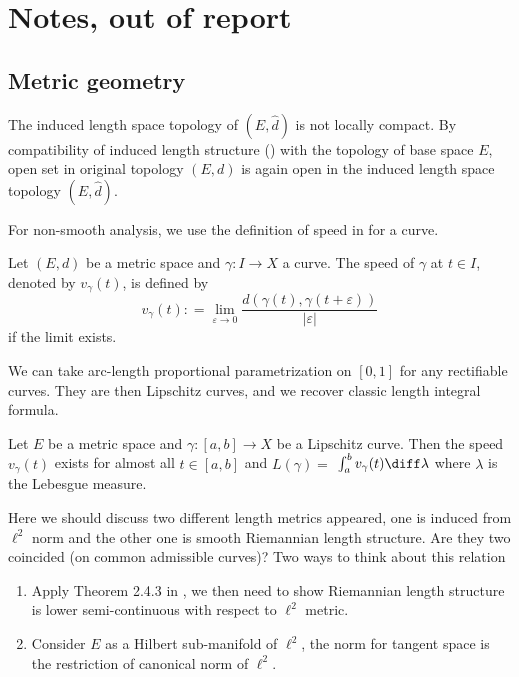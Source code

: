 \chapter{Notes, out of report}
\section{Metric geometry}

The induced length space topology of $(E, \hat{d})$ is not locally compact.
By compatibility of induced length structure (\cite[Exercise 2.1.5]{burago2001course}) with the topology of base space $E$,
open set in original topology $(E, d)$ is again open in the induced length space topology $(E, \hat{d})$.

For non-smooth analysis, we use the definition of speed in \cite[Section 2.7]{burago2001course} for a curve.

\begin{defn}
	Let \( ( E , d ) \) be a metric space and \( \gamma : I \rightarrow X \) a curve.
	The speed of \( \gamma \) at \( t \in I \), denoted by \( v _ { \gamma } ( t ) \),
	is defined by
	\[ v _ { \gamma } ( t ) : = \lim _ { \varepsilon \rightarrow 0 } \frac { d ( \gamma ( t ) , \gamma ( t + \varepsilon ) ) } { | \varepsilon | } \]
	if the limit exists.
\end{defn}

We can take arc-length proportional parametrization on $[0,1]$ for any rectifiable curves.
They are then Lipschitz curves, and we recover classic length integral formula.

\begin{thm}
	Let \( E \) be a metric space and \( \gamma : [ a , b ] \rightarrow X \) be a Lipschitz curve.
	Then the speed \( v _ { \gamma } ( t ) \) exists for almost all \( t \in [ a , b ] \) and \( L ( \gamma ) = \)
	\( \int _ { a } ^ { b } v _ { \gamma } ( t ) \diff \lambda \) where $\lambda$ is the Lebesgue measure.
\end{thm}

\begin{rmk}
	Here we should discuss two different length metrics appeared, one is induced from $\ell^2$ norm and the other one is smooth Riemannian length structure. Are they two coincided (on common admissible curves)? Two ways to think about this relation
	\begin{enumerate}
		\item Apply Theorem 2.4.3 in \cite{burago2001course}, we then need to show Riemannian length structure is lower semi-continuous with respect to $\ell^2$ metric.
		\item Consider $E$ as a Hilbert sub-manifold of $\ell^2$, the norm for tangent space is the restriction of canonical norm of $\ell^2$.
	\end{enumerate}
\end{rmk}
